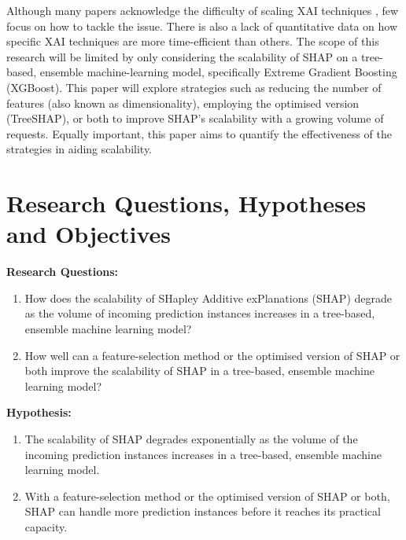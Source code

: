 \documentclass[12pt,a4paper]{article}
\begin{document}
Although many papers acknowledge the difficulty of scaling XAI techniques \citep{marques2022delivering}, few focus on how to tackle the issue. There is also a lack of quantitative data on how specific XAI techniques are more time-efficient than others.
The scope of this research will be limited by only considering the scalability of SHAP on a tree-based, ensemble machine-learning model, specifically Extreme Gradient Boosting (XGBoost). 
This paper will explore strategies such as reducing the number of features (also known as dimensionality), employing the optimised version (TreeSHAP), or both to improve SHAP's scalability with a growing volume of requests. Equally important, this paper aims to quantify the effectiveness of the strategies in aiding scalability.




\section{Research Questions, Hypotheses and Objectives}
\vspace{-1em}
\textbf{Research Questions:}\\
\vspace{-3em}
\begin{enumerate}
    \item How does the scalability of SHapley Additive exPlanations (SHAP) degrade as the volume of incoming prediction instances increases in a tree-based, ensemble machine learning model?
    \item How well can a feature-selection method or the optimised version of SHAP or both improve the scalability of SHAP in a tree-based, ensemble machine learning model?
\end{enumerate}

\textbf{Hypothesis:}\\
\vspace{-3em}
\begin{enumerate}
    \item The scalability of SHAP degrades exponentially as the volume of the incoming prediction instances increases in a tree-based, ensemble machine learning model.
    \item With a feature-selection method or the optimised version of SHAP or both, SHAP can handle more prediction instances before it reaches its practical capacity. 
\end{enumerate}
\end{document}
